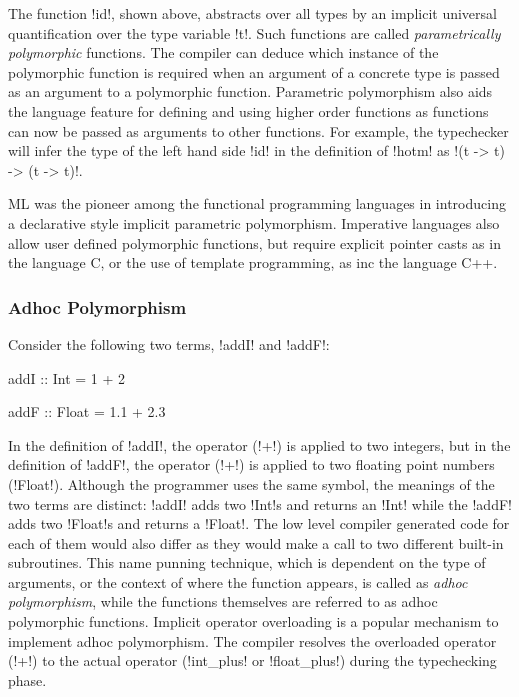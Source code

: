 \documentclass[screen,nonacm]{acmart}
\begin{document}
The function !id!, shown above, abstracts over all types by an implicit universal
quantification over the type variable !t!. Such functions are called \emph{parametrically
polymorphic} functions\cite{strachey_fundamental_2000}. The compiler
can deduce which instance of the polymorphic function is required when
an argument of a concrete type is passed as an argument to a
polymorphic function. Parametric polymorphism also aids the language feature for defining and using
higher order functions as functions can now be passed as arguments to other
functions. For example, the typechecker will infer the type of the
left hand side !id! in the definition of !hotm! as !(t -> t) -> (t -> t)!.

ML\cite{milner_logic_1975,milner_theory_1978}
was the pioneer among the functional programming languages in
introducing a declarative style implicit parametric polymorphism.
Imperative languages also allow user defined
polymorphic functions, but require explicit pointer casts as in the
language C, or the use of template programming, as inc the language C++.

\subsubsection{Adhoc Polymorphism}
Consider the following two terms, !addI! and !addF!:

\begin{minipage}[ht]{0.5\linewidth}
\begin{CenteredBox}
\begin{code}
addI :: Int = 1 + 2
\end{code}
\end{CenteredBox}
\end{minipage}%
\begin{minipage}[ht]{0.5\linewidth}
\begin{CenteredBox}
\begin{code}
addF :: Float = 1.1 + 2.3
\end{code}
\end{CenteredBox}
\end{minipage}

In the definition of !addI!, the operator (!+!) is applied to two
integers, but in the definition of !addF!, the operator (!+!) is
applied to two floating point numbers (!Float!). Although the
programmer uses the same symbol, the meanings of the two terms are
distinct: !addI! adds two !Int!s and returns an !Int! while the !addF!
adds two !Float!s and returns a !Float!. The low level compiler generated code
for each of them would also differ as they would make a call to two
different built-in subroutines. This name punning technique, which is dependent on the
type of arguments, or the context of where the function appears, is called as \emph{adhoc
polymorphism}\cite{strachey_fundamental_2000}, while the functions
themselves are referred to as adhoc polymorphic functions. Implicit
operator overloading is a popular mechanism to implement adhoc
polymorphism. The compiler resolves the overloaded operator (!+!) to
the actual operator (!int_plus! or !float_plus!) during the typechecking phase.
\end{document}
